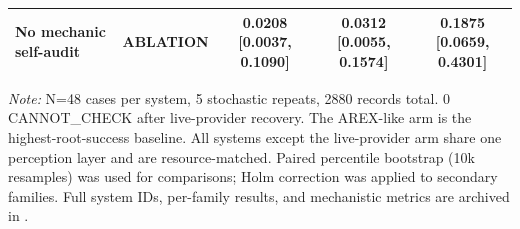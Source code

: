 \begin{table}[t]
\begin{tabular}{>{\raggedright\arraybackslash}p{3.05cm}lccc}
    No mechanic self-audit & ABLATION & 0.0208 [0.0037, 0.1090] & 0.0312 [0.0055, 0.1574] & 0.1875 [0.0659, 0.4301] \\
    \bottomrule
  \end{tabular}
  \par\smallskip
  \textit{Note:} N=48 cases per system, 5 stochastic repeats, 2880 records total. 0 CANNOT\_CHECK after live-provider recovery. The AREX-like arm is the highest-root-success baseline. All systems except the live-provider arm share one perception layer and are resource-matched. Paired percentile bootstrap (10k resamples) was used for comparisons; Holm correction was applied to secondary families. Full system IDs, per-family results, and mechanistic metrics are archived in .
\end{table}
